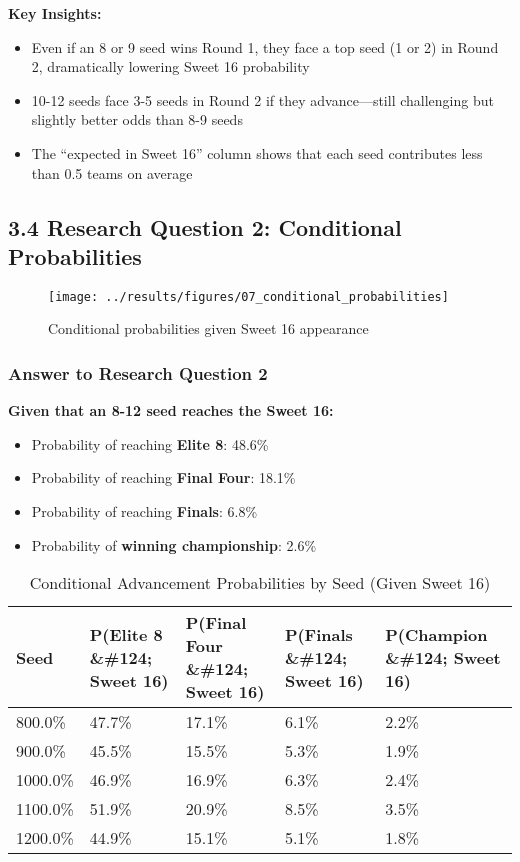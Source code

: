 \documentclass[
]{article}
\providecommand{\tightlist}{%
  \setlength{\itemsep}{0pt}\setlength{\parskip}{0pt}}
\begin{document}
\textbf{Key Insights:}

\begin{itemize}
\tightlist
\item
  Even if an 8 or 9 seed wins Round 1, they face a top seed (1 or 2) in
  Round 2, dramatically lowering Sweet 16 probability
\item
  10-12 seeds face 3-5 seeds in Round 2 if they advance---still
  challenging but slightly better odds than 8-9 seeds
\item
  The ``expected in Sweet 16'' column shows that each seed contributes
  less than 0.5 teams on average
\end{itemize}

\subsection{3.4 Research Question 2: Conditional
Probabilities}\label{research-question-2-conditional-probabilities}

\begin{figure}

{\centering \texttt{[image: ../results/figures/07\_conditional\_probabilities]} 

}

\caption{Conditional probabilities given Sweet 16 appearance}\label{fig:conditional-plot}
\end{figure}

\subsubsection{Answer to Research Question
2}\label{answer-to-research-question-2}

\textbf{Given that an 8-12 seed reaches the Sweet 16:}

\begin{itemize}
\tightlist
\item
  Probability of reaching \textbf{Elite 8}: 48.6\%
\item
  Probability of reaching \textbf{Final Four}: 18.1\%
\item
  Probability of reaching \textbf{Finals}: 6.8\%
\item
  Probability of \textbf{winning championship}: 2.6\%
\end{itemize}

\begin{longtable}[t]{lllll}
\caption{\label{tab:conditional-table}Conditional Advancement Probabilities by Seed (Given Sweet 16)}\\
\toprule
Seed & P(Elite 8 \&\#124; Sweet 16) & P(Final Four \&\#124; Sweet 16) & P(Finals \&\#124; Sweet 16) & P(Champion \&\#124; Sweet 16)\\
\midrule
800.0\% & 47.7\% & 17.1\% & 6.1\% & 2.2\%\\
900.0\% & 45.5\% & 15.5\% & 5.3\% & 1.9\%\\
1000.0\% & 46.9\% & 16.9\% & 6.3\% & 2.4\%\\
1100.0\% & 51.9\% & 20.9\% & 8.5\% & 3.5\%\\
1200.0\% & 44.9\% & 15.1\% & 5.1\% & 1.8\%\\
\bottomrule
\end{longtable}
\end{document}
